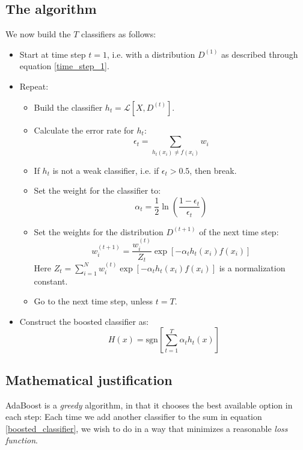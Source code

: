 \documentclass[12pt, a4paper]{article}
\numberwithin{equation}{section}
\begin{document}
\subsection{The algorithm}
We now build the $T$ classifiers as follows:
\begin{itemize}
\item Start at time step $t=1$, i.e. with a distribution $D^{(1)}$ as described through equation \ref{time_step_1}.
\item Repeat:
\begin{itemize}
\item Build the classifier $h_t=\mathcal{L}[X,D^{(t)}]$.
\item Calculate the error rate for $h_t$:
\begin{equation}
\epsilon_t=\sum_{h_t(x_i)\neq f(x_i)}w_i
\end{equation}
\item If $h_t$ is not a weak classifier, i.e. if $\epsilon_t>0.5$, then break.
\item Set the weight for the classifier to:
\begin{equation}
\alpha_t=\frac{1}{2}\ln\left(\frac{1-\epsilon_t}{\epsilon_t}\right)
\end{equation}
\item Set the weights for the distribution $D^{(t+1)}$ of the next time step:
\begin{equation}
w^{(t+1)}_i=\frac{w^{(t)}_i}{Z_t}\exp\left[-\alpha_t h_t(x_i)f(x_i)\right]
\end{equation}
Here $Z_t=\sum_{i=1}^N w^{(t)}_i\exp\left[-\alpha_t h_t(x_i)f(x_i)\right]$ is a normalization constant.
\item Go to the next time step, unless $t=T$.
\end{itemize}
\item Construct the boosted classifier as:
\begin{equation}
H(x)=\textrm{sgn}\left[\sum_{t=1}^T \alpha_t h_t(x)\right]
\end{equation}
\end{itemize}

\subsection{Mathematical justification}
AdaBoost is a \textit{greedy} algorithm, in that it chooses the best available option in each step: Each time we add another classifier to the sum in equation \ref{boosted_classifier}, we wish to do in a way that minimizes a reasonable \textit{loss function}.
\end{document}
